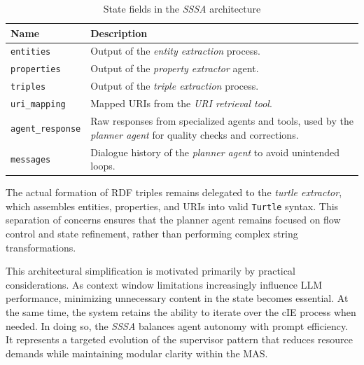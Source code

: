 \documentclass[a4paper,oneside,bibliography=totoc]{scrbook}
\begin{document}
\begin{table}[h]
  \centering
  \caption{State fields in the \textit{\ac{SSSA}} architecture}
  \label{tab:sssa_state}
  \begin{tabular}{p{3cm}p{10cm}}
    \toprule
    \textbf{Name}            & \textbf{Description}                                                                                                    \\
    \midrule
    \texttt{entities}        & Output of the \textit{entity extraction} process.                                                                       \\
    \texttt{properties}      & Output of the \textit{property extractor} agent.                                                                        \\
    \texttt{triples}         & Output of the \textit{triple extraction} process.                                                                       \\
    \texttt{uri\_mapping}    & Mapped \acp{URI} from the \textit{\ac{URI} retrieval tool}.                                                             \\
    \texttt{agent\_response} & Raw responses from specialized agents and tools, used by the \textit{planner agent} for quality checks and corrections. \\
    \texttt{messages}        & Dialogue history of the \textit{planner agent} to avoid unintended loops.                                               \\
    \bottomrule
  \end{tabular}
\end{table}

The actual formation of RDF triples remains delegated to the \textit{turtle extractor}, which assembles entities, properties, and \acp{URI} into valid \texttt{Turtle} syntax. This separation of concerns ensures that the planner agent remains focused on flow control and state refinement, rather than performing complex string transformations.

This architectural simplification is motivated primarily by practical considerations. As context window limitations increasingly influence \ac{LLM} performance, minimizing unnecessary content in the state becomes essential. At the same time, the system retains the ability to iterate over the \ac{cIE} process when needed. In doing so, the \textit{\ac{SSSA}} balances agent autonomy with prompt efficiency. It represents a targeted evolution of the supervisor pattern that reduces resource demands while maintaining modular clarity within the \ac{MAS}.
\end{document}
